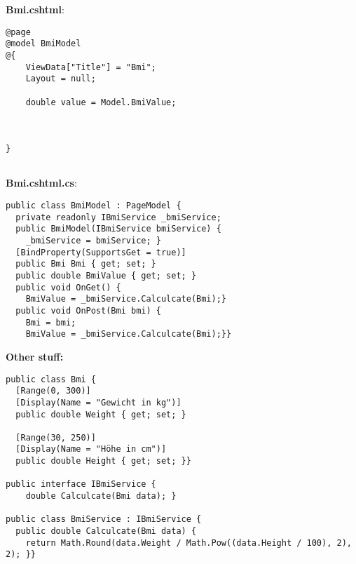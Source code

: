 \textbf{Bmi.cshtml}:
\begin{lstlisting}[style=CSharp]
@page
@model BmiModel
@{
    ViewData["Title"] = "Bmi";
    Layout = null;

    double value = Model.BmiValue;



}


\end{lstlisting}




\textbf{Bmi.cshtml.cs}:
\begin{lstlisting}[style=CSharp]
public class BmiModel : PageModel {
  private readonly IBmiService _bmiService;
  public BmiModel(IBmiService bmiService) {
    _bmiService = bmiService; }
  [BindProperty(SupportsGet = true)]
  public Bmi Bmi { get; set; }
  public double BmiValue { get; set; }
  public void OnGet() {
    BmiValue = _bmiService.Calculcate(Bmi);}
  public void OnPost(Bmi bmi) {
    Bmi = bmi;
    BmiValue = _bmiService.Calculcate(Bmi);}}
\end{lstlisting}

\textbf{Other stuff:}
\begin{lstlisting}[style=CSharp]
public class Bmi {
  [Range(0, 300)]
  [Display(Name = "Gewicht in kg")]
  public double Weight { get; set; }

  [Range(30, 250)]
  [Display(Name = "Höhe in cm")]
  public double Height { get; set; }}

public interface IBmiService {
    double Calculcate(Bmi data); }

public class BmiService : IBmiService {
  public double Calculcate(Bmi data) {
    return Math.Round(data.Weight / Math.Pow((data.Height / 100), 2), 2); }}
\end{lstlisting}






\vfill
$ $
